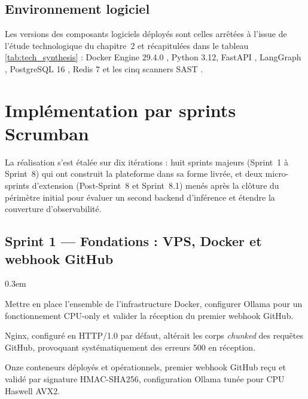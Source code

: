     \subsection{Environnement logiciel}

        Les versions des composants logiciels déployés sont celles arrêtées à l'issue
        de l'étude technologique du chapitre~2 et récapitulées dans le tableau
        \ref{tab:tech_synthesis} : Docker Engine 29.4.0 \cite{Docker}, Python 3.12,
        FastAPI \cite{FastAPI}, LangGraph \cite{LangGraph}, PostgreSQL 16
        \cite{PostgreSQL}, Redis 7 \cite{Redis} et les cinq scanners SAST
        \cite{Trivy, Gitleaks, Semgrep, Checkov, OSVScanner}.

\section{Implémentation par sprints Scrumban}

    La réalisation s'est étalée sur dix itérations : huit sprints majeurs
    (Sprint~1 à Sprint~8) qui ont construit la plateforme dans sa forme livrée,
    et deux micro-sprints d'extension (Post-Sprint~8 et Sprint~8.1) menés après la
    clôture du périmètre initial pour évaluer un second backend d'inférence et
    étendre la couverture d'observabilité.


    \subsection{Sprint 1 — Fondations : VPS, Docker et webhook GitHub}

        \begin{description}
            \itemsep 0.3em
            \item[Objectif du sprint :] Mettre en place l'ensemble de l'infrastructure
                Docker, configurer Ollama pour un fonctionnement CPU-only et valider
                la réception du premier webhook GitHub.
            \item[Obstacles rencontrés :] Nginx, configuré en HTTP/1.0 par défaut,
                altérait les corps \textit{chunked} des requêtes GitHub, provoquant
                systématiquement des erreurs 500 en réception.
            \item[Livrable :] Onze conteneurs déployés et opérationnels, premier
                webhook GitHub reçu et validé par signature HMAC-SHA256, configuration
                Ollama tunée pour CPU Haswell AVX2.
        \end{description}

